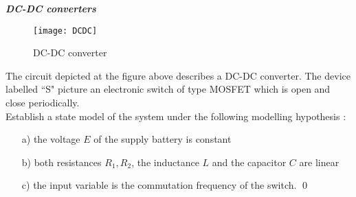 \begin{exercice}{\bf \em DC-DC converters}

\begin{figure}[htbp]
\begin{center}
\texttt{[image: DCDC]}
\caption{DC-DC converter}
\label{fig:DCDC}
\end{center}
\end{figure}
The circuit depicted at the figure above describes a DC-DC converter.  
The device labelled ``S" picture an electronic switch of type MOSFET 
which is open and close periodically.\\

Establish a state model of the system under the following modelling 
hypothesis :
\begin{itemize}
\item[a)] the voltage $E$ of the supply battery is constant
\item[b)] both resistances $R_1, R_2$, the inductance $L$ and the 
capacitor $C$ are linear
\item[c)] the input variable is the commutation frequency of the switch. \qed
\end{itemize} 
\end{exercice}




